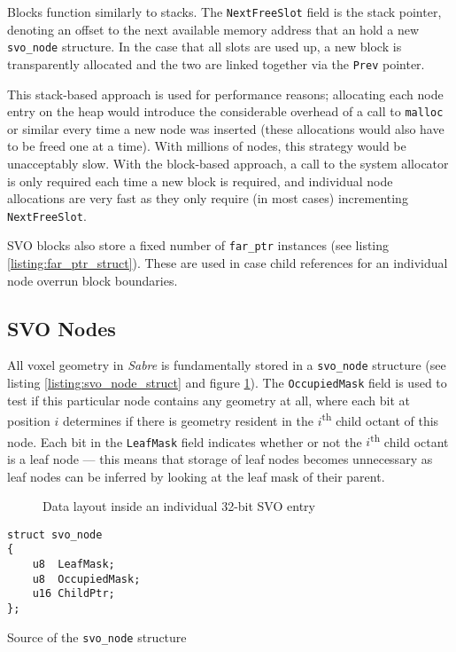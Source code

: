Blocks function similarly to stacks. The \texttt{NextFreeSlot} field is the stack pointer, denoting an offset to the next available memory address that an hold a new \texttt{svo\_node} structure. In the case that all slots are used up, a new block is transparently allocated and the two are linked together via the \texttt{Prev} pointer. 

This stack-based approach is used for performance reasons; allocating each node entry on the heap would introduce the considerable overhead of a call to \texttt{malloc} or similar every time a new node was inserted (these allocations would also have to be freed one at a time). With millions of nodes, this strategy would be unacceptably slow. With the block-based approach, a call to the system allocator is only required each time a new block is required, and individual node allocations are very fast as they only require (in most cases) incrementing \texttt{NextFreeSlot}.

SVO blocks also store a fixed number of \texttt{far\_ptr} instances (see listing \ref{listing:far_ptr_struct}). These are used in case child references for an individual node overrun block boundaries.

\subsection{SVO Nodes}
All voxel geometry in \textit{Sabre} is fundamentally stored in a \texttt{svo\_node} structure (see listing \ref{listing:svo_node_struct} and figure \ref{fig:svo_entry}). The \texttt{OccupiedMask} field is used to test if this particular node contains any geometry at all, where each bit at position $i$ determines if there is geometry resident in the $i$\textsuperscript{th} child octant of this node. Each bit in the \texttt{LeafMask} field indicates whether or not the $i$\textsuperscript{th} child octant is a leaf node --- this means that storage of leaf nodes becomes unnecessary as leaf nodes can be inferred by looking at the leaf mask of their parent. 

\begin{figure}[ht]
    \centering
    \footnotesize
    
    \caption{Data layout inside an individual 32-bit SVO entry}
    \label{fig:svo_entry}
\end{figure}

\begin{listing}[ht]
\begin{verbatim}
struct svo_node
{
    u8  LeafMask;
    u8  OccupiedMask;
    u16 ChildPtr;
};
\end{verbatim}
\caption{Source of the \texttt{svo\_node} structure}
\label{listing:svo_node_struct}
\end{listing}

